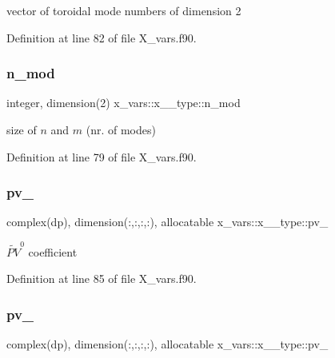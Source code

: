 vector of toroidal mode numbers of dimension 2 



Definition at line 82 of file X\+\_\+vars.\+f90.

\mbox{\label{structx__vars_1_1x__2__type_a87efa10d03a1570fca946a56f7af7b25}} 
\subsubsection{\texorpdfstring{n\+\_\+mod}{n\_mod}}
{\footnotesize\ttfamily integer, dimension(2) x\+\_\+vars\+::x\+\_\+\_\+type\+::n\+\_\+mod}



size of $n$ and $m$ (nr. of modes) 



Definition at line 79 of file X\+\_\+vars.\+f90.

\mbox{\label{structx__vars_1_1x__2__type_a5b7c4fa433fe46dabc806a7fbb1832dc}} 
\subsubsection{\texorpdfstring{pv\+\_}{pv\_0}}
{\footnotesize\ttfamily complex(dp), dimension(\+:,\+:,\+:,\+:), allocatable x\+\_\+vars\+::x\+\_\+\_\+type\+::pv\+\_}



$\widetilde{PV}^0$ coefficient 



Definition at line 85 of file X\+\_\+vars.\+f90.

\mbox{\label{structx__vars_1_1x__2__type_a53910430e36de0ca91359322bdcf1e86}} 
\subsubsection{\texorpdfstring{pv\+\_}{pv\_1}}
{\footnotesize\ttfamily complex(dp), dimension(\+:,\+:,\+:,\+:), allocatable x\+\_\+vars\+::x\+\_\+\_\+type\+::pv\+\_}



